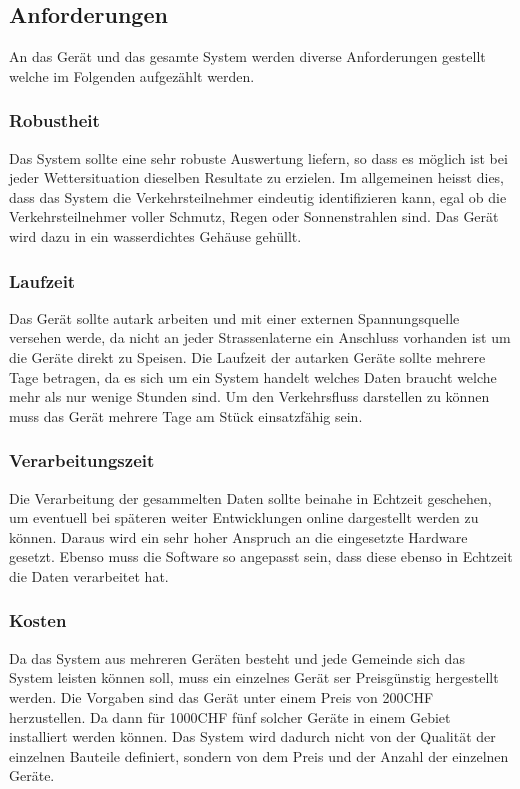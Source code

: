 \subsection{Anforderungen}
An das Gerät und das gesamte System werden diverse Anforderungen gestellt welche im Folgenden aufgezählt werden.
\subsubsection{Robustheit}
Das System sollte eine sehr robuste Auswertung liefern, so dass es möglich ist bei jeder Wettersituation dieselben Resultate zu erzielen. Im allgemeinen heisst dies, dass das System die Verkehrsteilnehmer eindeutig identifizieren kann, egal ob die Verkehrsteilnehmer voller Schmutz, Regen oder Sonnenstrahlen sind. Das Gerät wird dazu in ein wasserdichtes Gehäuse gehüllt. 
\subsubsection{Laufzeit}
Das Gerät sollte autark arbeiten und mit einer externen Spannungsquelle versehen werde, da nicht an jeder Strassenlaterne ein Anschluss vorhanden ist um die Geräte direkt zu Speisen. Die Laufzeit der autarken Geräte sollte mehrere Tage betragen, da es sich um ein System handelt welches Daten braucht welche mehr als nur wenige Stunden sind. Um den Verkehrsfluss darstellen zu können muss das Gerät mehrere Tage am Stück einsatzfähig sein.
\subsubsection{Verarbeitungszeit}
Die Verarbeitung der gesammelten Daten sollte beinahe in Echtzeit geschehen, um eventuell bei späteren weiter Entwicklungen online dargestellt werden zu können. Daraus wird ein sehr hoher Anspruch an die eingesetzte Hardware gesetzt. Ebenso muss die Software so angepasst sein, dass diese ebenso in Echtzeit die Daten verarbeitet hat.
\subsubsection{Kosten}
Da das System aus mehreren Geräten besteht und jede Gemeinde sich das System leisten können soll, muss ein einzelnes Gerät ser Preisgünstig hergestellt werden. Die Vorgaben sind das Gerät unter einem Preis von 200CHF herzustellen. Da dann für 1000CHF fünf solcher Geräte in einem Gebiet installiert werden können. Das System wird dadurch nicht von der Qualität der einzelnen Bauteile definiert, sondern von dem Preis und der Anzahl der einzelnen Geräte.
